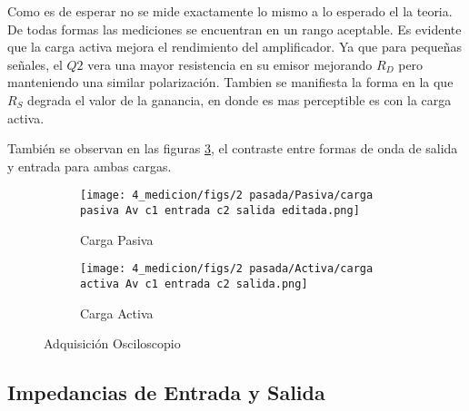 Como es de esperar no se mide exactamente lo mismo a lo esperado el la teoria. De todas formas las mediciones se encuentran en un rango aceptable. 
Es evidente que la carga activa mejora el rendimiento del amplificador. Ya que para pequeñas señales, el $Q2$ vera una mayor resistencia en su emisor mejorando $R_D$ pero manteniendo una similar polarización. 
Tambien se manifiesta la forma en la que $R_S$ degrada el valor de la ganancia, en donde es mas perceptible es con la carga activa.

También se observan en las figuras \ref{fig:Av oscilo}, el contraste entre formas de onda de salida y entrada para ambas cargas.



\begin{figure}[ht]
\begin{subfigure}{.45\textwidth}
  \centering
  \texttt{[image: 4\_medicion/figs/2 pasada/Pasiva/carga pasiva Av c1 entrada c2 salida editada.png]}  
  \caption{Carga Pasiva}
  \label{fig:Av carga pasiva}
\end{subfigure}
\begin{subfigure}{.45\textwidth}
  \centering
  \texttt{[image: 4\_medicion/figs/2 pasada/Activa/carga activa Av c1 entrada c2 salida.png]}  
  \caption{Carga Activa}
  \label{fig:Av carga activa}
\end{subfigure}
\caption{Adquisición Osciloscopio}
\label{fig:Av oscilo}
\end{figure}

\subsection{Impedancias de Entrada y Salida}

